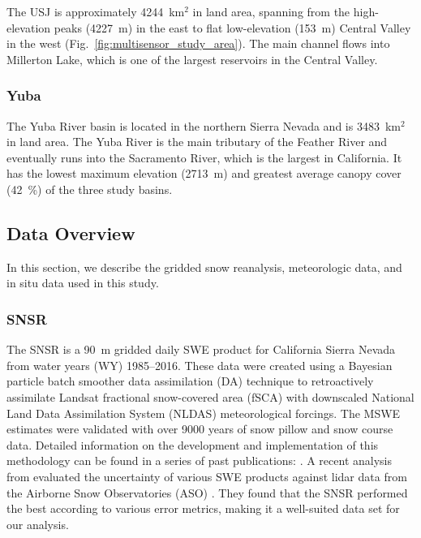 The USJ is approximately 4244~km$^{2}$ in land area, spanning from the high-elevation peaks (4227~m) in the east to flat low-elevation (153~m) Central Valley in the west (Fig.~\ref{fig:multisensor_study_area}). The main channel flows into Millerton Lake, which is one of the largest reservoirs in the Central Valley. 


\hypertarget{ch2-sa-1}{\subsubsection{Yuba}\label{ch2-sa-1}}

The Yuba River basin is located in the northern Sierra Nevada and is 3483~km$^{2}$ in land area. The Yuba River is the main tributary of the Feather River and eventually runs into the Sacramento River, which is the largest in California. It has the lowest maximum elevation (2713~m) and greatest average canopy cover (42~\%) of the three study basins. 

\hypertarget{ch2-do-1}{\subsection{Data Overview}\label{ch2-do-1}}

In this section, we describe the gridded snow reanalysis, meteorologic data, and in situ data used in this study.

\hypertarget{ch2-do-2}{\subsubsection{SNSR}\label{ch2-do-2}}

The SNSR \citep{margulisLandsatEraSierraNevada2016} is a 90~m gridded daily SWE product for California Sierra Nevada from water years (WY) 1985--2016. These data were created using a Bayesian particle batch smoother data assimilation (DA) technique to retroactively assimilate Landsat fractional snow-covered area (fSCA) with downscaled National Land Data Assimilation System (NLDAS) meteorological forcings. The MSWE estimates were validated with over 9000 years of snow pillow and snow course data. Detailed information on the development and implementation of this methodology can be found in a series of past publications: \cite{durandBayesianApproachSnow2008, girottoExaminingSpatialTemporal2014, girottoProbabilisticSWEReanalysis2014, margulisParticleBatchSmoother2015}. A recent analysis from \cite{yangIntercomparisonSnowWater2023} evaluated the uncertainty of various SWE products against lidar data from the Airborne Snow Observatories (ASO) \citep{painterAirborneSnowObservatory2016}. They found that the SNSR performed the best according to various error metrics, making it a well-suited data set for our analysis.

